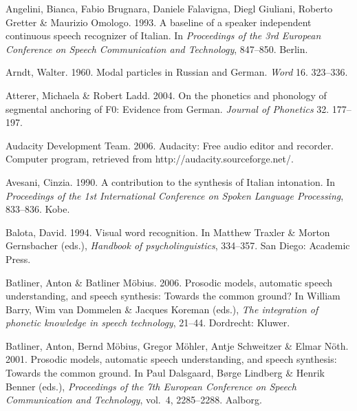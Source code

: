 \documentclass[ number=1
,series=labphon
,output=long
,url=http://langsci-press.org/catalog/book/16
,isbn=978-3-944675-01-5
]{LSP/langsci}
\begin{document}
\begin{thebibliography}{284}
Angelini, Bianca, Fabio Brugnara, Daniele Falavigna, Diegl Giuliani, Roberto
  Gretter \& Maurizio Omologo. 1993.
\newblock A baseline of a speaker independent continuous speech recognizer of
  {I}talian.
\newblock In \emph{Proceedings of the 3rd {European Conference on Speech
  Communication and Technology}}, 847--850. Berlin.

Arndt, Walter. 1960.
\newblock Modal particles in {R}ussian and {G}erman.
\newblock \emph{Word} 16. 323--336.

Atterer, Michaela \& Robert Ladd. 2004.
\newblock On the phonetics and phonology of segmental anchoring of {F}0:
  {E}vidence from {G}erman.
\newblock \emph{Journal of Phonetics} 32. 177--197.

{Audacity Development Team}. 2006.
\newblock Audacity: {F}ree audio editor and recorder.
\newblock Computer program, retrieved from http://audacity.sourceforge.net/.

Avesani, Cinzia. 1990.
\newblock A contribution to the synthesis of {I}talian intonation.
\newblock In \emph{Proceedings of the 1st {International Conference on Spoken
  Language Processing}}, 833--836. Kobe.

Balota, David. 1994.
\newblock Visual word recognition.
\newblock In Matthew Traxler \& Morton Gernsbacher (eds.), \emph{Handbook of
  psycholinguistics}, 334--357. San Diego: Academic Press.

Batliner, Anton \& Batliner M{\"o}bius. 2006.
\newblock Prosodic models, automatic speech understanding, and speech
  synthesis: {T}owards the common ground?
\newblock In William Barry, Wim {van Dommelen} \& Jacques Koreman (eds.),
  \emph{The integration of phonetic knowledge in speech technology}, 21--44.
  Dordrecht: Kluwer.

Batliner, Anton, Bernd M{\"o}bius, Gregor M{\"o}hler, Antje Schweitzer \& Elmar
  N{\"o}th. 2001.
\newblock Prosodic models, automatic speech understanding, and speech
  synthesis: {T}owards the common ground.
\newblock In Paul Dalsgaard, Børge Lindberg \& Henrik Benner (eds.),
  \emph{Proceedings of the 7th {European Conference on Speech Communication and
  Technology}}, vol.~4, 2285--2288. Aalborg.


\end{thebibliography}
\end{document}
